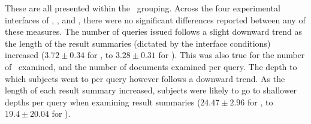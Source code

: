 These are all presented within the ~grouping. Across the four experimental interfaces of , ,  and , there were no significant differences reported between any of these measures. The number of queries issued follows a slight downward trend as the length of the result summaries (dictated by the interface conditions) increased ($3.72 \pm 0.34$ for , to $3.28\pm0.31$ for ). This was also true for the number of~ examined, and the number of documents examined per query. The depth to which subjects went to per query however follows a downward trend. As the length of each result summary increased, subjects were likely to go to shallower depths per query when examining result summaries ($24.47\pm2.96$ for , to $19.4\pm20.04$ for ).

